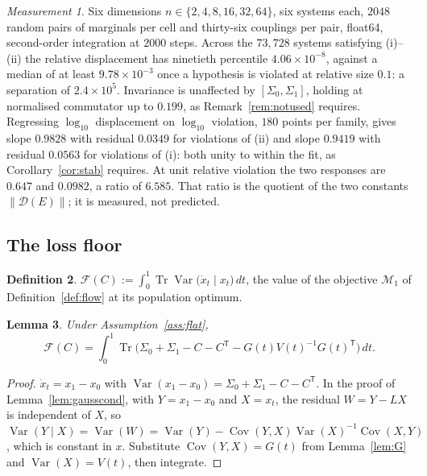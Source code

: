 \documentclass[11pt]{article}
\newtheorem{lemma}{Lemma}[section]
\theoremstyle{definition}
\newtheorem{definition}[lemma]{Definition}
\theoremstyle{remark}
\newtheorem{measurement}[lemma]{Measurement}
\DeclareMathOperator{\Cov}{Cov}
\DeclareMathOperator{\Var}{Var}
\newcommand{\T}{\mathsf{T}}
\begin{document}
\begin{measurement}\label{meas:stab}
Six dimensions $n\in\{2,4,8,16,32,64\}$, six systems each, $2048$ random pairs of marginals per
cell and thirty-six couplings per pair, float64, second-order integration at $2000$ steps. Across
the $73{,}728$ systems satisfying (i)--(ii) the relative displacement has ninetieth percentile
$4.06\times10^{-8}$, against a median of at least $9.78\times10^{-3}$ once a hypothesis is
violated at relative size $0.1$: a separation of $2.4\times10^{5}$. Invariance is unaffected by
$[\Sigma_0,\Sigma_1]$, holding at normalised commutator up to $0.199$, as
Remark~\ref{rem:notused} requires. Regressing $\log_{10}$ displacement on $\log_{10}$ violation,
$180$ points per family, gives slope $0.9828$ with residual $0.0349$ for violations of (ii) and
slope $0.9419$ with residual $0.0563$ for violations of (i): both unity to within the fit, as
Corollary~\ref{cor:stab} requires. At unit relative violation the two responses are $0.647$ and
$0.0982$, a ratio of $6.585$. That ratio is the quotient of the two constants
$\|\mathcal D(E)\|$; it is measured, not predicted.
\end{measurement}

\subsection{The loss floor}

\begin{definition}\label{def:floor}
$\mathcal F(C):=\displaystyle\int_0^1\operatorname{Tr}\Var\big(\dot x_t\mid x_t\big)\,dt$, the
value of the objective $\mathcal M_1$ of Definition~\ref{def:flow} at its population optimum.
\end{definition}

\begin{lemma}\label{lem:floor}
Under Assumption~\ref{ass:flat},
\begin{equation}\label{eq:floor}
\mathcal F(C)=\int_0^1\operatorname{Tr}\Big(\Sigma_0+\Sigma_1-C-C^{\T}
-G(t)V(t)^{-1}G(t)^{\T}\Big)\,dt .
\end{equation}
\end{lemma}

\begin{proof}
$\dot x_t=x_1-x_0$ with $\Var(x_1-x_0)=\Sigma_0+\Sigma_1-C-C^{\T}$. In the proof of
Lemma~\ref{lem:gausscond}, with $Y=x_1-x_0$ and $X=x_t$, the residual $W=Y-LX$ is independent of
$X$, so $\Var(Y\mid X)=\Var(W)=\Var(Y)-\Cov(Y,X)\Var(X)^{-1}\Cov(X,Y)$, which is constant in $x$.
Substitute $\Cov(Y,X)=G(t)$ from Lemma~\ref{lem:G} and $\Var(X)=V(t)$, then integrate.
\end{proof}
\end{document}
